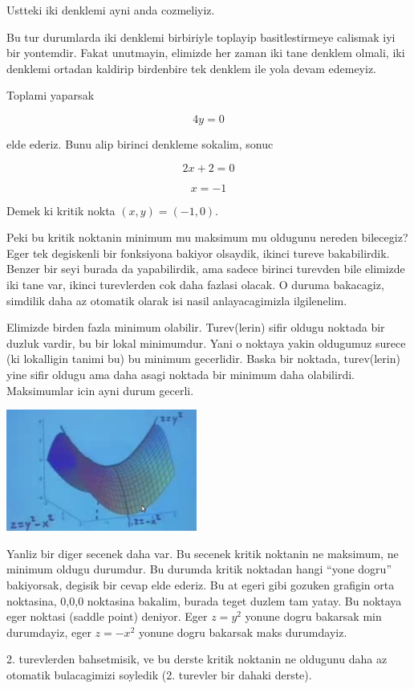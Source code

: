 \documentclass[12pt,fleqn]{article}\usepackage{../common}
\begin{document}
Ustteki iki denklemi ayni anda cozmeliyiz. 

Bu tur durumlarda iki denklemi birbiriyle toplayip basitlestirmeye calismak
iyi bir yontemdir. Fakat unutmayin, elimizde her zaman iki tane denklem
olmali, iki denklemi ortadan kaldirip birdenbire tek denklem ile yola devam
edemeyiz. 

Toplami yaparsak

\[ 4y = 0 \]

elde ederiz. Bunu alip birinci denkleme sokalim, sonuc

\[ 2x + 2 = 0 \]

\[ x = -1 \]

Demek ki kritik nokta $(x,y) = (-1,0)$. 

Peki bu kritik noktanin minimum mu maksimum mu oldugunu nereden bilecegiz?
Eger tek degiskenli bir fonksiyona bakiyor olsaydik, ikinci tureve
bakabilirdik. Benzer bir seyi burada da yapabilirdik, ama sadece birinci
turevden bile elimizde iki tane var, ikinci turevlerden cok daha fazlasi
olacak. O duruma bakacagiz, simdilik daha az otomatik olarak isi nasil
anlayacagimizla ilgilenelim. 

Elimizde birden fazla minimum olabilir. Turev(lerin) sifir oldugu noktada
bir duzluk vardir, bu bir lokal minimumdur. Yani o noktaya yakin oldugumuz
surece (ki lokalligin tanimi bu) bu minimum gecerlidir. Baska bir noktada,
turev(lerin) yine sifir oldugu ama daha asagi noktada bir minimum daha
olabilirdi. Maksimumlar icin ayni durum gecerli.

\includegraphics[height=4cm]{9_4.png}

Yanliz bir diger secenek daha var. Bu secenek kritik noktanin ne maksimum,
ne minimum oldugu durumdur. Bu durumda kritik noktadan hangi ``yone dogru''
bakiyorsak, degisik bir cevap elde ederiz. Bu at egeri gibi gozuken
grafigin orta noktasina, 0,0,0 noktasina bakalim, burada teget duzlem tam
yatay. Bu noktaya eger noktasi (saddle point) deniyor. Eger $z=y^2$ yonune
dogru bakarsak min durumdayiz, eger $z=-x^2$ yonune dogru bakarsak maks
durumdayiz. 

2. turevlerden bahsetmisik, ve bu derste kritik noktanin ne oldugunu daha
az otomatik bulacagimizi soyledik (2. turevler bir dahaki derste). 
\end{document}
